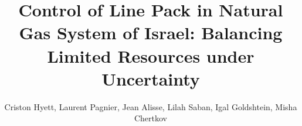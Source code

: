 
\title[Control of Line Pack in Natural Gas System of Israel]{Control of Line Pack in Natural Gas System of Israel:
Balancing Limited Resources under Uncertainty}
\author[Hyett, Pagnier, Alisse, Saban, Goldshtein, Chertkov]{Criston Hyett, Laurent Pagnier, Jean Alisse, Lilah Saban, Igal Goldshtein, Misha Chertkov}


\graphicspath{{./NOGA-UA-gas/figs/}}
\begin{frame}
  \maketitle
\end{frame}
